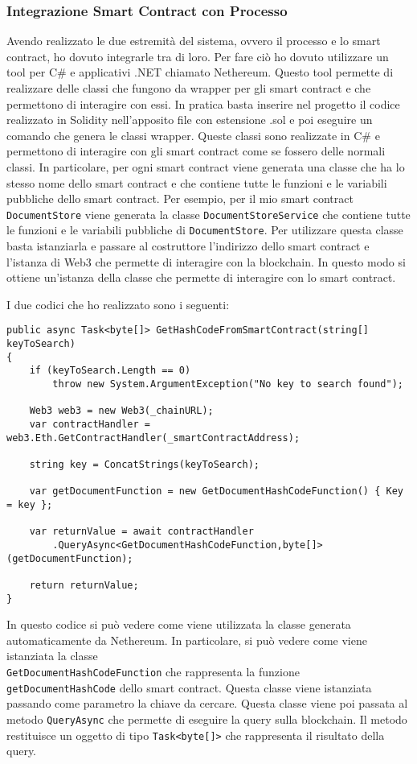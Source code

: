 \subsubsection{Integrazione Smart Contract con Processo}
Avendo realizzato le due estremità del sistema, ovvero il processo e lo smart
contract, ho dovuto integrarle tra di loro. Per fare ciò ho dovuto utilizzare
un tool per C\# e applicativi .NET chiamato Nethereum. Questo tool permette di
realizzare delle classi che fungono da wrapper per gli smart contract e che
permettono di interagire con essi. In pratica basta inserire nel progetto
il codice realizzato in Solidity nell'apposito file con estensione .sol e poi
eseguire un comando che genera le classi wrapper. Queste classi sono
realizzate in C\# e permettono di interagire con gli smart contract come se
fossero delle normali classi. In particolare, per ogni smart contract viene
generata una classe che ha lo stesso nome dello smart contract e che contiene
tutte le funzioni e le variabili pubbliche dello smart contract. Per esempio,
per il mio smart contract \texttt{DocumentStore} viene generata la classe
\texttt{DocumentStoreService} che contiene tutte le funzioni e le variabili
pubbliche di \texttt{DocumentStore}. Per utilizzare questa classe basta
istanziarla e passare al costruttore l'indirizzo dello smart contract e
l'istanza di Web3 che permette di interagire con la blockchain. In questo modo
si ottiene un'istanza della classe che permette di interagire con lo smart
contract. 

I due codici che ho realizzato sono i seguenti:
\begin{lstlisting}[language=CSharp]
public async Task<byte[]> GetHashCodeFromSmartContract(string[] keyToSearch)
{
    if (keyToSearch.Length == 0)
        throw new System.ArgumentException("No key to search found");

    Web3 web3 = new Web3(_chainURL);
    var contractHandler = web3.Eth.GetContractHandler(_smartContractAddress);

    string key = ConcatStrings(keyToSearch);

    var getDocumentFunction = new GetDocumentHashCodeFunction() { Key = key };

    var returnValue = await contractHandler
        .QueryAsync<GetDocumentHashCodeFunction,byte[]>(getDocumentFunction);

    return returnValue;
}
\end{lstlisting}

In questo codice si può vedere come viene utilizzata la classe generata
automaticamente da Nethereum. In particolare, si può vedere come viene
istanziata la classe \\ \texttt{GetDocumentHashCodeFunction} che rappresenta la
funzione \texttt{getDocumentHashCode} dello smart contract. Questa classe
viene istanziata passando come parametro la chiave da cercare. Questa classe
viene poi passata al metodo \texttt{QueryAsync} che permette di eseguire la
query sulla blockchain. Il metodo restituisce un oggetto di tipo
\texttt{Task<byte[]>} che rappresenta il risultato della query.

